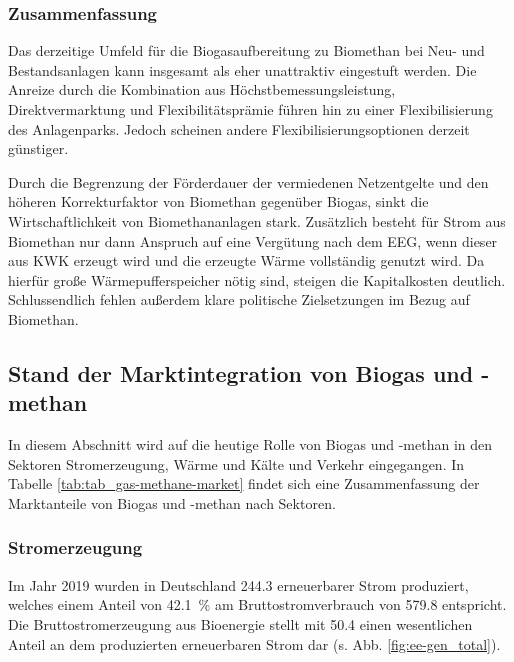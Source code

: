 \subsubsection{Zusammenfassung}

Das derzeitige Umfeld für die Biogasaufbereitung zu Biomethan bei Neu- und Bestandsanlagen kann insgesamt als eher unattraktiv eingestuft werden. Die Anreize durch die Kombination aus Höchstbemessungsleistung, Direktvermarktung und Flexibilitätsprämie führen hin zu einer Flexibilisierung des Anlagenparks. Jedoch scheinen andere Flexibilisierungsoptionen derzeit günstiger.\smallskip

Durch die Begrenzung der Förderdauer der vermiedenen Netzentgelte und den höheren Korrekturfaktor von Biomethan gegenüber Biogas, sinkt die Wirtschaftlichkeit von Biomethananlagen stark. Zusätzlich besteht für Strom aus Biomethan nur dann Anspruch auf eine Vergütung nach dem \gls{EEG}, wenn dieser aus \gls{KWK} erzeugt wird und die erzeugte Wärme vollständig genutzt wird. Da hierfür große Wärmepufferspeicher nötig sind, steigen die Kapitalkosten deutlich. Schlussendlich fehlen außerdem klare politische Zielsetzungen im Bezug auf Biomethan. 

\subsection{Stand der Marktintegration von Biogas und -methan}

In diesem Abschnitt wird auf die heutige Rolle von Biogas und -methan in den Sektoren Stromerzeugung, Wärme und Kälte und Verkehr eingegangen. In Tabelle \ref{tab:tab_gas-methane-market} findet sich eine Zusammenfassung der Marktanteile von Biogas und -methan nach Sektoren.




\subsubsection{Stromerzeugung}

Im Jahr 2019 wurden in Deutschland \SI{244.3}{\twh} erneuerbarer Strom produziert, welches einem Anteil von \SI{42.1}{\percent} am Bruttostromverbrauch von \SI{579.8}{\twh} entspricht. Die Bruttostromerzeugung aus Bioenergie stellt mit \SI{50.4}{\twh} einen wesentlichen Anteil an dem produzierten erneuerbaren Strom dar (s. Abb. \ref{fig:ee-gen_total}). \parencite{BWE2020} 



